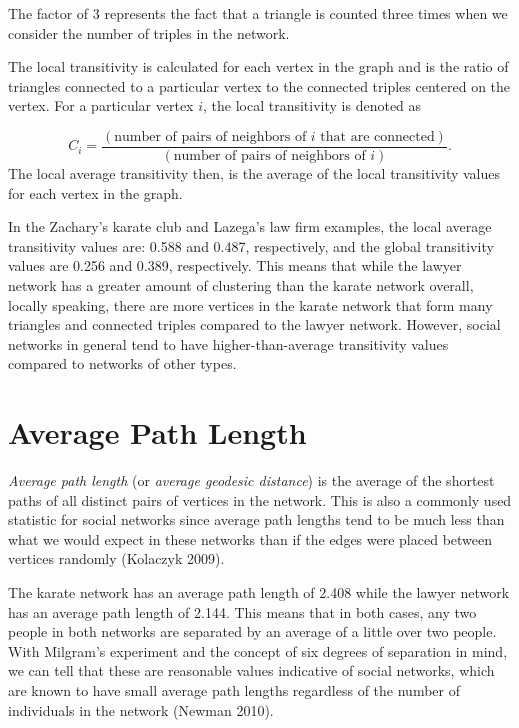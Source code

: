 \documentclass[12pt,twoside]{amherstthesis}
\begin{document}
  The factor of \(3\) represents the fact that a triangle is counted three
  times when we consider the number of triples in the network.
  
  The local transitivity is calculated for each vertex in the graph and is
  the ratio of triangles connected to a particular vertex to the connected
  triples centered on the vertex. For a particular vertex \(i\), the local
  transitivity is denoted as
  
  \[ C_{i} = \frac {(\text{number of pairs of neighbors of } i \text{ that are connected})} {(\text{number of pairs of neighbors of } i)}.\]
  The local average transitivity then, is the average of the local
  transitivity values for each vertex in the graph.
  
  In the Zachary's karate club and Lazega's law firm examples, the local
  average transitivity values are: 0.588 and 0.487, respectively, and the
  global transitivity values are 0.256 and 0.389, respectively. This means
  that while the lawyer network has a greater amount of clustering than
  the karate network overall, locally speaking, there are more vertices in
  the karate network that form many triangles and connected triples
  compared to the lawyer network. However, social networks in general tend
  to have higher-than-average transitivity values compared to networks of
  other types.
  
  \section{Average Path Length}\label{average-path-length}
  
  \emph{Average path length} (or \emph{average geodesic distance}) is the
  average of the shortest paths of all distinct pairs of vertices in the
  network. This is also a commonly used statistic for social networks
  since average path lengths tend to be much less than what we would
  expect in these networks than if the edges were placed between vertices
  randomly (Kolaczyk 2009).
  
  The karate network has an average path length of 2.408 while the lawyer
  network has an average path length of 2.144. This means that in both
  cases, any two people in both networks are separated by an average of a
  little over two people. With Milgram's experiment and the concept of six
  degrees of separation in mind, we can tell that these are reasonable
  values indicative of social networks, which are known to have small
  average path lengths regardless of the number of individuals in the
  network (Newman 2010).
  
\end{document}
